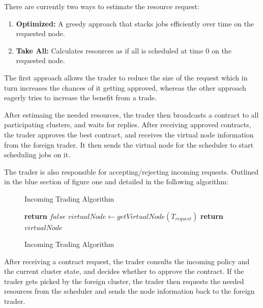 There are currently two ways to estimate the resource request: 
\begin{enumerate}

  \item \textbf{Optimized:} A greedy approach that stacks jobs efficiently over
    time on the requested node.

  \item \textbf{Take All:} Calculates resources as if all is scheduled at time
    0 on the requested node.

\end{enumerate}

The first approach allows the trader to reduce the size of the request which in
turn increases the chances of it getting approved, whereas the other approach
eagerly tries to increase the benefit from a trade.

After estimaing the needed resources, the trader then broadcasts a contract to
all participating clusters, and waits for replies. After receiving approved
contracts, the trader approves the best contract, and receives the virtual node
information from the foreign trader. It then sends the virtual node for the
scheduler to start scheduling jobs on it.

The trader is also responsible for accepting/rejecting incoming requests.
Outlined in the blue section of figure one and detailed in the following
algorithm: 

\begin{figure}[H]
\begin{algorithm}[H]
\caption{Incoming Trading Algorithm}
\begin{algorithmic}
   
       
      \State \textbf{return} $false$ 
      \EndIf
    \EndFor
    \State $virtualNode \gets getVirtualNode(T_{request})$     
    \State \textbf{return} $virtualNode$ 
  \EndProcedure
\end{algorithmic}
\end{algorithm}
\caption{Incoming Trading Algorithm}
\end{figure}

After receiving a contract request, the trader consults the incoming policy and the
current cluster state, and decides whether to approve the contract. If the
trader gets picked by the foreign cluster, the trader then requests the needed
resources from the scheduler and sends the node information back to the foreign
trader.

